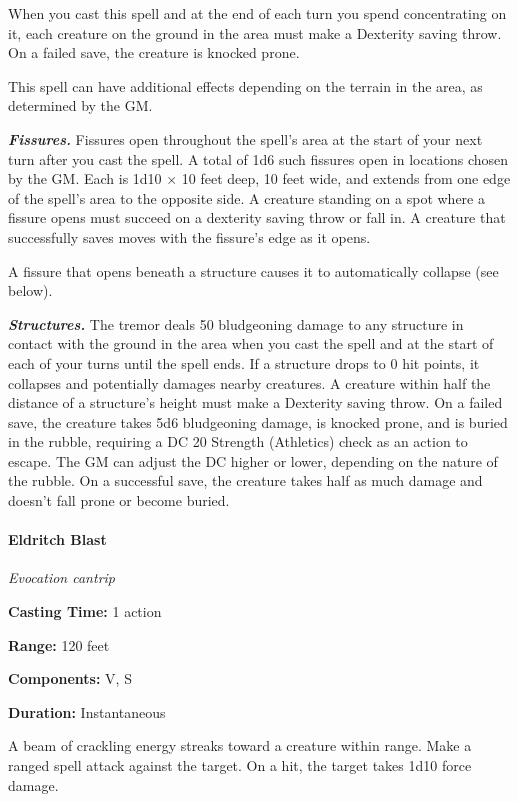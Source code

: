 \documentclass[
]{article}
\begin{document}
When you cast this spell and at the end of each turn you spend
concentrating on it, each creature on the ground in the area must make a
Dexterity saving throw. On a failed save, the creature is knocked prone.

This spell can have additional effects depending on the terrain in the
area, as determined by the GM.

\emph{\textbf{Fissures.}} Fissures open throughout the spell's area at
the start of your next turn after you cast the spell. A total of 1d6
such fissures open in locations chosen by the GM. Each is 1d10 × 10 feet
deep, 10 feet wide, and extends from one edge of the spell's area to the
opposite side. A creature standing on a spot where a fissure opens must
succeed on a dexterity saving throw or fall in. A creature that
successfully saves moves with the fissure's edge as it opens.

A fissure that opens beneath a structure causes it to automatically
collapse (see below).

\emph{\textbf{Structures.}} The tremor deals 50 bludgeoning damage to
any structure in contact with the ground in the area when you cast the
spell and at the start of each of your turns until the spell ends. If a
structure drops to 0 hit points, it collapses and potentially damages
nearby creatures. A creature within half the distance of a structure's
height must make a Dexterity saving throw. On a failed save, the
creature takes 5d6 bludgeoning damage, is knocked prone, and is buried
in the rubble, requiring a DC 20 Strength (Athletics) check as an action
to escape. The GM can adjust the DC higher or lower, depending on the
nature of the rubble. On a successful save, the creature takes half as
much damage and doesn't fall prone or become buried.

\hypertarget{eldritch-blast}{%
\paragraph{Eldritch Blast}\label{eldritch-blast}}

\emph{Evocation cantrip}

\textbf{Casting Time:} 1 action

\textbf{Range:} 120 feet

\textbf{Components:} V, S

\textbf{Duration:} Instantaneous

A beam of crackling energy streaks toward a creature within range. Make
a ranged spell attack against the target. On a hit, the target takes
1d10 force damage.
\end{document}
